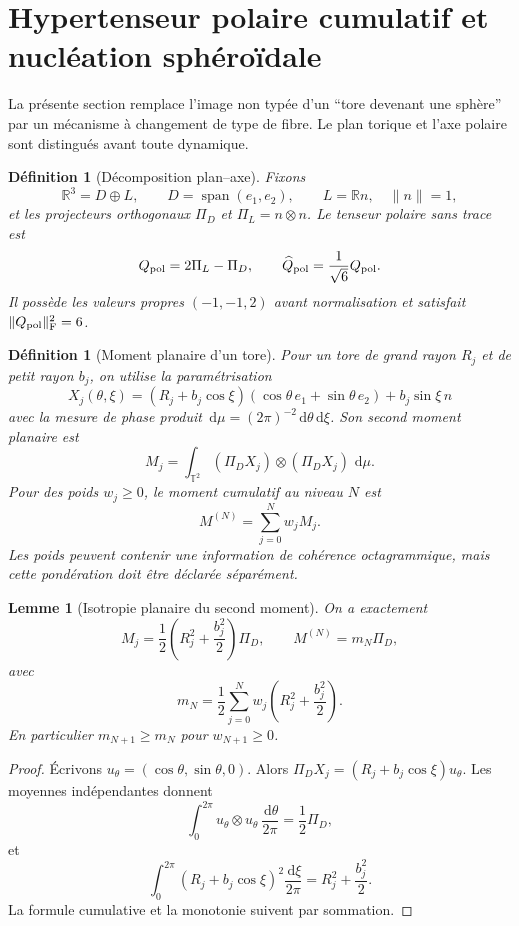 \documentclass[11pt,a4paper]{article}
\newtheorem{lemma}[theorem]{Lemme}
\newtheorem{definition}[theorem]{Définition}
\newcommand{\R}{\mathbb R}
\newcommand{\T}{\mathbb T}
\newcommand{\dd}{\,\mathrm d}
\begin{document}
\section{Hypertenseur polaire cumulatif et nucléation sphéroïdale}

La présente section remplace l'image non typée d'un ``tore devenant une sphère'' par un mécanisme à changement de type de fibre. Le plan torique et l'axe polaire sont distingués avant toute dynamique.

\begin{definition}[Décomposition plan--axe]
Fixons
\[
 \R^3=D\oplus L,
 \qquad D=\operatorname{span}(e_1,e_2),
 \qquad L=\R n,
 \quad \|n\|=1,
\]
et les projecteurs orthogonaux $\Pi_D$ et $\Pi_L=n\otimes n$. Le tenseur polaire sans trace est
\begin{equation}\label{eq:Qpol}
 Q_{\rm pol}=2\Pi_L-\Pi_D,
 \qquad \widehat Q_{\rm pol}=\frac1{\sqrt6}Q_{\rm pol}.
\end{equation}
Il possède les valeurs propres $(-1,-1,2)$ avant normalisation et satisfait
$\|Q_{\rm pol}\|_{\rm F}^2=6$.
\end{definition}

\begin{definition}[Moment planaire d'un tore]
Pour un tore de grand rayon $R_j$ et de petit rayon $b_j$, on utilise la paramétrisation
\[
 X_j(\theta,\xi)=
 (R_j+b_j\cos\xi)(\cos\theta\,e_1+\sin\theta\,e_2)
 +b_j\sin\xi\,n
\]
avec la mesure de phase produit $\dd\mu=(2\pi)^{-2}\dd\theta\dd\xi$. Son second moment planaire est
\[
 M_j=\int_{\T^2}(\Pi_DX_j)\otimes(\Pi_DX_j)\,\dd\mu.
\]
Pour des poids $w_j\ge0$, le moment cumulatif au niveau $N$ est
\[
 M^{(N)}=\sum_{j=0}^{N}w_jM_j.
\]
Les poids peuvent contenir une information de cohérence octagrammique, mais cette pondération doit être déclarée séparément.
\end{definition}

\begin{lemma}[Isotropie planaire du second moment]\label{lem:torusmoment}
On a exactement
\begin{equation}\label{eq:torusmoment}
 M_j=\frac12\left(R_j^2+\frac{b_j^2}{2}\right)\Pi_D,
 \qquad
 M^{(N)}=m_N\Pi_D,
\end{equation}
avec
\[
 m_N=\frac12\sum_{j=0}^{N}w_j\left(R_j^2+\frac{b_j^2}{2}\right).
\]
En particulier $m_{N+1}\ge m_N$ pour $w_{N+1}\ge0$.
\end{lemma}

\begin{proof}
Écrivons $u_\theta=(\cos\theta,\sin\theta,0)$. Alors
$\Pi_DX_j=(R_j+b_j\cos\xi)u_\theta$. Les moyennes indépendantes donnent
\[
 \int_0^{2\pi}u_\theta\otimes u_\theta\,\frac{\dd\theta}{2\pi}
 =\frac12\Pi_D,
\]
et
\[
 \int_0^{2\pi}(R_j+b_j\cos\xi)^2\frac{\dd\xi}{2\pi}
 =R_j^2+\frac{b_j^2}{2}.
\]
La formule cumulative et la monotonie suivent par sommation.
\end{proof}
\end{document}
